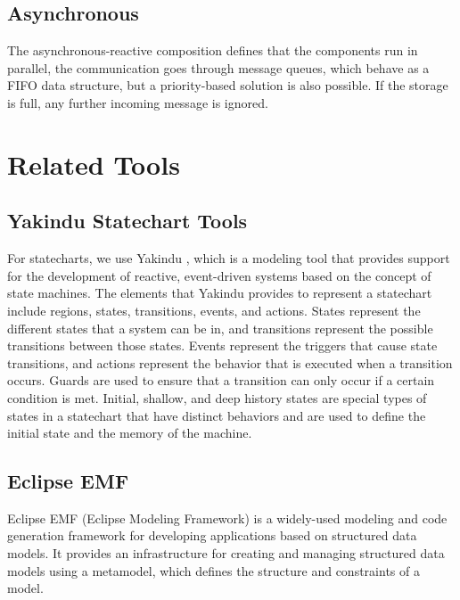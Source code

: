 \subsection{Asynchronous}

The asynchronous-reactive composition defines that the components run in parallel, the communication goes through message queues, which behave as a FIFO data structure, but a priority-based solution is also possible. If the storage is full, any further incoming message is ignored.

\newpage

\section{Related Tools}

\subsection{Yakindu Statechart Tools}

For statecharts, we use Yakindu \cite{Yakindu}, which is a modeling tool that provides support for the development of reactive, event-driven systems based on the concept of state machines. The elements that Yakindu provides to represent a statechart include regions, states, transitions, events, and actions. States represent the different states that a system can be in, and transitions represent the possible transitions between those states. Events represent the triggers that cause state transitions, and actions represent the behavior that is executed when a transition occurs. Guards are used to ensure that a transition can only occur if a certain condition is met. Initial, shallow, and deep history states are special types of states in a statechart that have distinct behaviors and are used to define the initial state and the memory of the machine.

\subsection{Eclipse EMF}

Eclipse EMF \cite{EMF} (Eclipse Modeling Framework) is a widely-used modeling and code generation framework for developing applications based on structured data models. It provides an infrastructure for creating and managing structured data models using a metamodel, which defines the structure and constraints of a model.

